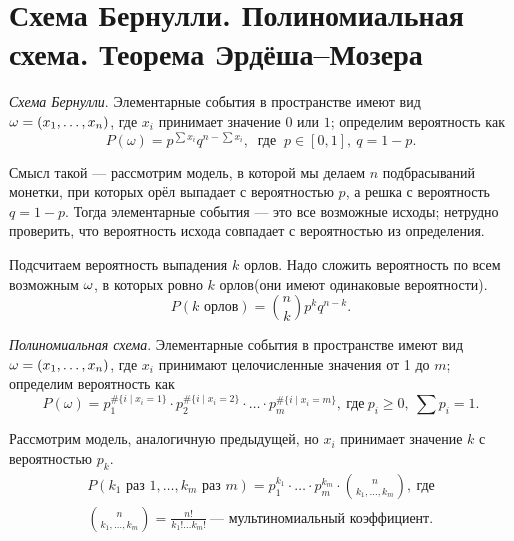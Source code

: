 \section{Схема Бернулли. Полиномиальная схема. Теорема Эрдёша–Мозера}

\begin{definition} \textit{Схема Бернулли}. Элементарные события в пространстве имеют вид $\omega = (x_1, \ldots, x_n)$, где $x_i$ принимает значение $0$ или $1$; определим вероятность как
    $$P(\omega) = p^{\sum x_i}q^{n - \sum x_i},\ \text{ где } \ p \in [0, 1], \ q = 1-p.$$ 
    \end{definition}
   
   Смысл такой --- рассмотрим модель, в которой мы делаем $n$ подбрасываний монетки, при которых орёл выпадает с вероятностью $p$, а решка с вероятность $q=1-p$. Тогда элементарные события --- это все возможные исходы; нетрудно проверить, что вероятность исхода совпадает с вероятностью из определения. 
   
   Подсчитаем вероятность выпадения $k$ орлов. Надо сложить вероятность по всем возможным $\omega$, в которых ровно $k$ орлов(они имеют одинаковые вероятности).
   $$P(k \text{ орлов}) = \binom{n}{k}p^kq^{n - k}.$$
   
    \begin{definition}\textit{Полиномиальная схема}.
   Элементарные события в пространстве имеют вид $\omega = (x_1, \ldots, x_n)$, где $x_i$ принимают целочисленные значения от 1 до $m$; определим вероятность как
   $$P(\omega) = p_1^{\#\{i\mid x_i = 1\}}\cdot p_2^{\#\{i\mid x_i = 2\}}\cdot\ldots\cdot p_m^{\#\{i\mid x_i = m\}},\ \text{где} \ p_i \ge 0, \ \sum p_i = 1.$$
    \end{definition}
   Рассмотрим модель, аналогичную предыдущей, но $x_i$ принимает значение $k$ с вероятностью $p_k$.
   \begin{gather*}
       P(k_1 \text{ раз } 1, \ldots, k_m \text{ раз } m) = p_1^{k_1}\cdot\ldots\cdot p_m^{k_m}\cdot \binom{n}{k_1,\ldots, k_m}, \ \text{где} \\ \binom{n}{k_1,\ldots, k_m} = \frac{n!}{k_1!\ldots k_m!} \ \text{--- мультиномиальный коэффициент.}
   \end{gather*}
    \newpage
